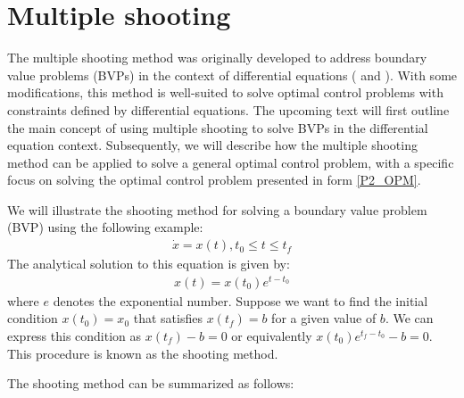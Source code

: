 \documentclass  [
  paper    = a4,
  BCOR     = 10mm,
  twoside,
  fontsize = 12pt,
  fleqn,
  toc      = bibnumbered,
  toc      = listofnumbered,
  numbers  = noendperiod,
  headings = normal,
  listof   = leveldown,
  version  = 3.03
]                                       {scrreprt}
\newcommand{\<}{\langle}
\renewcommand{\>}{\rangle}
\begin{document}


\section{Multiple shooting}
The multiple shooting method was originally developed to address boundary value problems (BVPs) in the context of differential equations (\cite{DJJ62} and \cite{Michael69}). With some modifications, this method is well-suited to solve optimal control problems with constraints defined by differential equations. The upcoming text will first outline the main concept of using multiple shooting to solve BVPs in the differential equation context. Subsequently, we will describe how the multiple shooting method can be applied to solve a general optimal control problem, with a specific focus on solving the optimal control problem presented in form \ref{P2_OPM}.


We will illustrate the shooting method for solving a boundary value problem (BVP) using the following example:
\begin{align*}
	\dot{x} = x(t), t_0 \leq t \leq t_f
\end{align*}
The analytical solution to this equation is given by:
\begin{align*}
	x(t) = x(t_0)e^{t - t_0}
\end{align*}
where $e$ denotes the exponential number. Suppose we want to find the initial condition $x(t_0) = x_0$ that satisfies $x(t_f) = b$ for a given value of $b$. We can express this condition as $x(t_f)-b = 0$ or equivalently $x(t_0)e^{t_f - t_0}-b = 0$. This procedure is known as the shooting method.

The shooting method can be summarized as follows:
\end{document}
